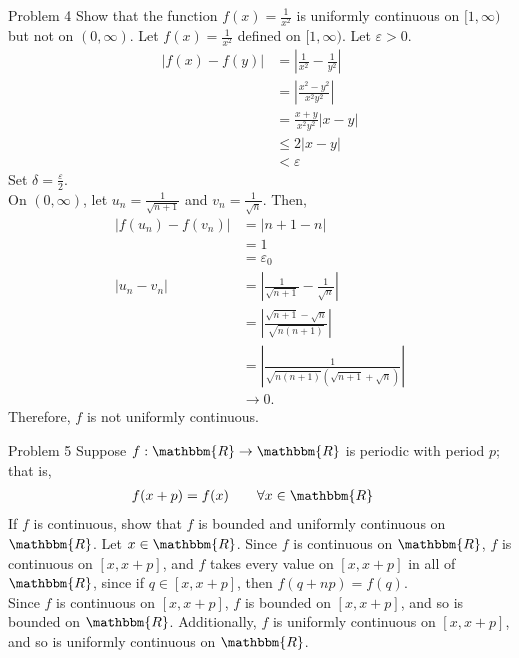 \documentclass[8pt]{extarticle}
\newcommand{\R}{\mathbbm{R}}
\begin{document}
  \begin{problem}{Problem 4}
    Show that the function $f(x) = \frac{1}{x^2}$ is uniformly continuous on $[1,\infty)$ but not on $(0,\infty)$.
    \tcblower
    Let $f(x) = \frac{1}{x^2}$ defined on $[1,\infty)$. Let $\varepsilon > 0$.
    \begin{align*}
      \left|f(x) - f(y)\right| &= \left|\frac{1}{x^2}-\frac{1}{y^2}\right|\\
                               &= \left|\frac{x^2 - y^2}{x^2y^2}\right|\\
                               &= \frac{x+y}{x^2y^2}\left|x - y\right|\\
                               & \leq 2\left|x-y\right|\\
                               &< \varepsilon
    \end{align*}
    Set $\delta = \frac{\varepsilon}{2}$.\\

    On $(0,\infty)$, let $u_n = \frac{1}{\sqrt{n+1}}$ and $v_n = \frac{1}{\sqrt{n}}$. Then,
    \begin{align*}
      \left|f(u_n) - f(v_n)\right| &= \left|n+1 - n\right|\\
                                   &= 1\\
                                   &= \varepsilon_0\\
      \left|u_n - v_n\right| &= \left|\frac{1}{\sqrt{n+1}} - \frac{1}{\sqrt{n}}\right|\\
                             &= \left|\frac{\sqrt{n+1} - \sqrt{n}}{\sqrt{n(n+1)}}\right|\\
                             &= \left|\frac{1}{\sqrt{n(n+1)}\left(\sqrt{n+1} + \sqrt{n}\right)}\right|\\
                             &\rightarrow 0.
    \end{align*}
    Therefore, $f$ is not uniformly continuous.
  \end{problem}
  \begin{problem}{Problem 5}
    Suppose $f: \R\rightarrow \R$ is periodic with period $p$; that is,
    \begin{align*}
      f(x+p) &= f(x)\tag*{$\forall x\in\R$}
    \end{align*}
    If $f$ is continuous, show that $f$ is bounded and uniformly continuous on $\R$.
    \tcblower
    Let $x\in\R$. Since $f$ is continuous on $\R$, $f$ is continuous on $[x,x+p]$, and $f$ takes every value on $[x,x+p]$ in all of $\R$, since if $q\in [x,x+p]$, then $f(q+np) = f(q)$.\\

    Since $f$ is continuous on $[x,x+p]$, $f$ is bounded on $[x,x+p]$, and so is bounded on $\R$. Additionally, $f$ is uniformly continuous on $[x,x+p]$, and so is uniformly continuous on $\R$.
  \end{problem}
\end{document}
